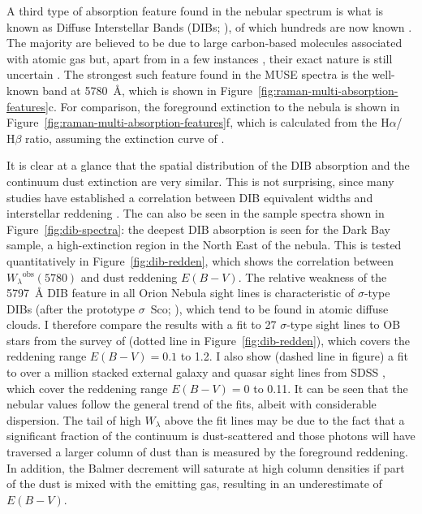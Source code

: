 \documentclass[useAMS, usenatbib, a4paper]{mnras}
\newcommand\ha{\ensuremath{\text{H}\alpha}}
\newcommand\hb{\ensuremath{\text{H}\beta}}
\newcommand\observed{\ensuremath{^{\text{obs}}}}
\begin{document}
A third type of absorption feature found in the nebular spectrum
is what is known as Diffuse Interstellar Bands (DIBs; \citealp{Heger:1922a}),
of which hundreds are now known \citep{Galazutdinov:2000a, Hobbs:2008a}.
The majority are believed to be due to large carbon-based molecules
associated with atomic gas \citep{Sonnentrucker:2014a}
but, apart from in a few instances \citep{Cordiner:2019a},
their exact nature is still uncertain \citep{Tielens:2014a, Omont:2019a, Lai:2020a}.
The strongest such feature found in the MUSE spectra is the well-known band
at \SI{5780}{\angstrom}, which is shown in Figure~\ref{fig:raman-multi-absorption-features}c.
For comparison, the foreground extinction to the nebula is shown in
Figure~\ref{fig:raman-multi-absorption-features}f,
which is calculated from the \ha{}/\hb{} ratio,
assuming the extinction curve of \citet{Blagrave:2007a}.

It is clear at a glance that the spatial distribution of the
DIB absorption and the continuum dust extinction are very similar.
This is not surprising, since many studies have established
a correlation between DIB equivalent widths and interstellar reddening
\citep{Friedman:2011a, Kos:2013a, Baron:2015a, Kreowski:2019b}.
The can also be seen in the sample spectra shown in Figure~\ref{fig:dib-spectra}:
the deepest DIB absorption is seen for the Dark Bay sample,
a high-extinction region in the North East of the nebula. 
This is tested quantitatively in Figure~\ref{fig:dib-redden},
which shows the correlation between \(W_\lambda\observed(5780)\)
and dust reddening \(E(B - V)\).
The relative weakness of the \SI{5797}{\angstrom} DIB feature in all
Orion Nebula sight lines is characteristic of \(\sigma\)-type DIBs
(after the prototype \(\sigma\)~Sco; \citealp{Krelowski:1988a}),
which tend to be found in atomic diffuse clouds. 
I therefore compare the results with a fit to 27 \(\sigma\)-type sight lines to
OB stars from the survey of \citet{Kos:2013a} (dotted line in Figure~\ref{fig:dib-redden}),
which covers the reddening range \(E(B - V) = 0.1\) to \num{1.2}.
I also show (dashed line in figure) a fit to over a million stacked external galaxy and quasar sight lines from SDSS \citep{Baron:2015a}, which cover the reddening range
\(E(B - V) = 0\) to \num{0.11}.
It can be seen that the nebular values follow the general trend of the fits,
albeit with considerable dispersion.
The tail of high \(W_\lambda\) above the fit lines may be due to the fact that
a significant fraction of the continuum is dust-scattered and those photons
will have traversed a larger column of dust than is measured by the foreground reddening.
In addition, the Balmer decrement will saturate at high column densities
if part of the dust is mixed with the emitting gas, resulting in an underestimate
of \(E(B - V)\). 
\end{document}
